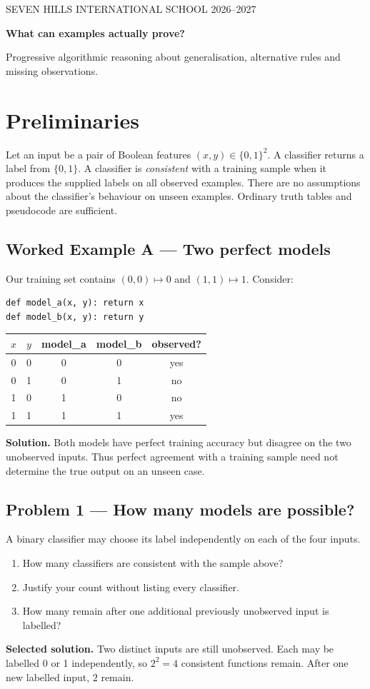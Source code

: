 \documentclass[11pt,a4paper]{article}
\newcommand{\problem}[1]{\subsection*{Problem #1}}
\newcommand{\worked}[1]{\subsection*{Worked Example #1}}
\begin{document}
{\small SEVEN HILLS INTERNATIONAL SCHOOL \hfill 2026--2027}

{\Large\bfseries What can examples actually prove?}\par
Progressive algorithmic reasoning about generalisation, alternative rules and missing observations.

\section*{Preliminaries}
Let an input be a pair of Boolean features $(x,y)\in\{0,1\}^2$. A classifier returns a label from $\{0,1\}$. A classifier is \emph{consistent} with a training sample when it produces the supplied labels on all observed examples. There are no assumptions about the classifier's behaviour on unseen examples. Ordinary truth tables and pseudocode are sufficient.

\worked{A --- Two perfect models}
Our training set contains $(0,0)\mapsto 0$ and $(1,1)\mapsto 1$. Consider:
\begin{verbatim}
def model_a(x, y): return x
def model_b(x, y): return y
\end{verbatim}
\begin{center}
\begin{tabular}{ccccc}\toprule
$x$ & $y$ & model\_a & model\_b & observed?\\\midrule
0&0&0&0&yes\\
0&1&0&1&no\\
1&0&1&0&no\\
1&1&1&1&yes\\\bottomrule
\end{tabular}
\end{center}
\textbf{Solution.} Both models have perfect training accuracy but disagree on the two unobserved inputs. Thus perfect agreement with a training sample need not determine the true output on an unseen case.

\problem{1 --- How many models are possible?}
A binary classifier may choose its label independently on each of the four inputs.
\begin{enumerate}[label=(\alph*)]
\item How many classifiers are consistent with the sample above?
\item Justify your count without listing every classifier.
\item How many remain after one additional previously unobserved input is labelled?
\end{enumerate}
\textbf{Selected solution.} Two distinct inputs are still unobserved. Each may be labelled 0 or 1 independently, so $2^2=4$ consistent functions remain. After one new labelled input, $2$ remain.
\end{document}
